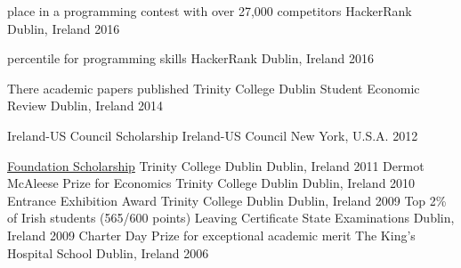   
    \begin{cvhonors}
       
       \cvhonor
        { place in a programming contest with over 27,000 competitors}
        {HackerRank}
        {Dublin, Ireland}
        {2016}
       
       \cvhonor
        { percentile for programming skills}
        {HackerRank}
        {Dublin, Ireland}
        {2016}
       
       \cvhonor
        {There academic papers published}
        {Trinity College Dublin Student Economic Review}
        {Dublin, Ireland}
        {2014}
       
       \cvhonor
        {Ireland-US Council Scholarship}
        {Ireland-US Council}
        {New York, U.S.A.}
        {2012}
      
      \cvhonor
        {\href{https://en.wikipedia.org/wiki/Trinity_College,_Dublin\#Scholarship}{\textcolor{awesome-skyblue}{Foundation Scholarship}}}
        {Trinity College Dublin}
        {Dublin, Ireland}
        {2011}
      \cvhonor
        {Dermot McAleese Prize for Economics}
        {Trinity College Dublin}
        {Dublin, Ireland}
        {2010}
      \cvhonor
        {Entrance Exhibition Award}
        {Trinity College Dublin}
        {Dublin, Ireland}
        {2009}
    \cvhonor
        {Top 2\% of Irish students (565/600 points)}
        {Leaving Certificate State Examinations}
        {Dublin, Ireland}
        {2009}
      \cvhonor
        {Charter Day Prize for exceptional academic merit}
        {The King's Hospital School}
        {Dublin, Ireland}
        {2006}
    \end{cvhonors}

  


 
   